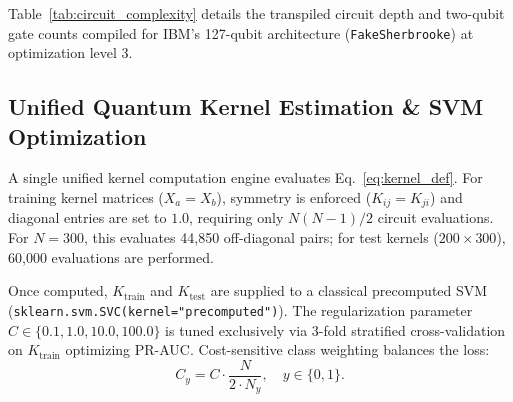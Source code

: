 \documentclass[12pt,a4paper]{article}
\begin{document}
Table~\ref{tab:circuit_complexity} details the transpiled circuit depth and two-qubit gate counts compiled for IBM's 127-qubit architecture (\texttt{FakeSherbrooke}) at optimization level 3.

\begin{table}[ht]
\centering
\small
\caption{Compiled circuit complexity on IBM 127-qubit architecture.}
\label{tab:circuit_complexity}
\end{table}

\subsection{Unified Quantum Kernel Estimation \& SVM Optimization}

A single unified kernel computation engine evaluates Eq.~\eqref{eq:kernel_def}. For training kernel matrices ($X_a = X_b$), symmetry is enforced ($K_{ij} = K_{ji}$) and diagonal entries are set to $1.0$, requiring only $N(N-1)/2$ circuit evaluations. For $N=300$, this evaluates 44,850 off-diagonal pairs; for test kernels ($200 \times 300$), 60,000 evaluations are performed.

Once computed, $K_{\text{train}}$ and $K_{\text{test}}$ are supplied to a classical precomputed SVM (\texttt{sklearn.svm.SVC(kernel="precomputed")}). The regularization parameter $C \in \{0.1, 1.0, 10.0, 100.0\}$ is tuned exclusively via 3-fold stratified cross-validation on $K_{\text{train}}$ optimizing PR-AUC. Cost-sensitive class weighting balances the loss:
\begin{equation}
    C_y = C \cdot \frac{N}{2 \cdot N_y}, \quad y \in \{0, 1\}.
\end{equation}
\end{document}
